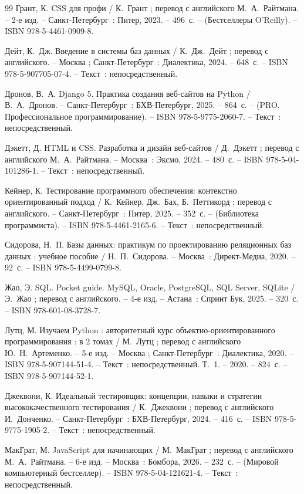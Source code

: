 \begin{thebibliography}{99}
     Грант, К. CSS для профи / К.~Грант ; перевод с английского М.~А.~Райтмана. -- 2-е изд. -- Санкт-Петербург~: Питер, 2023. -- 496~с. -- (Бестселлеры O'Reilly). -- ISBN 978-5-4461-0909-8. 

     Дейт, К.~Дж. Введение в системы баз данных / К.~Дж.~Дейт ; перевод с английского. -- Москва ; Санкт-Петербург~: Диалектика, 2024. -- 648~с. -- ISBN 978-5-907705-07-4. -- Текст~: непосредственный.

     Дронов, В.~А. Django 5. Практика создания веб-сайтов на Python / В.~А.~Дронов. -- Санкт-Петербург~: БХВ-Петербург, 2025. -- 864~с. -- (PRO. Профессиональное программирование). -- ISBN 978-5-9775-2060-7. -- Текст~: непосредственный.

     Дэкетт, Д. HTML и CSS. Разработка и дизайн веб-сайтов / Д.~Дэкетт ; перевод с английского М.~А.~Райтмана. -- Москва~: Эксмо, 2024. -- 480~с. -- ISBN 978-5-04-101286-1. -- Текст~: непосредственный.

     Кейнер, К. Тестирование программного обеспечения: контекстно ориентированный подход / К.~Кейнер, Дж.~Бах, Б.~Петтикорд ; перевод с английского. -- Санкт-Петербург~: Питер, 2025. -- 352~с. -- (Библиотека программиста). -- ISBN 978-5-4461-2165-6. -- Текст~: непосредственный.

     Сидорова, Н.~П. Базы данных: практикум по проектированию реляционных баз данных : учебное пособие / Н.~П.~Сидорова. -- Москва~: Директ-Медиа, 2020. -- 92~с. -- ISBN 978-5-4499-0799-8. 

     Жао, Э. SQL. Pocket guide. MySQL, Oracle, PostgreSQL, SQL Server, SQLite / Э.~Жао ; перевод с английского. -- 4-е изд. -- Астана~: Спринт Бук, 2025. -- 320~с. -- ISBN 978-601-08-3728-7. 

     Лутц, М. Изучаем Python : авторитетный курс объектно-ориентированного программирования : в 2 томах / М.~Лутц ; перевод с английского Ю.~Н.~Артеменко. -- 5-е изд. -- Москва ; Санкт-Петербург~: Диалектика, 2020. -- ISBN 978-5-907144-51-4. -- Текст~: непосредственный.
    Т.~1. -- 2020. -- 824~с. -- ISBN 978-5-907144-52-1.

     Джеквони, К. Идеальный тестировщик: концепции, навыки и стратегии высококачественного тестирования / К.~Джеквони ; перевод с английского И.~Донченко. -- Санкт-Петербург~: БХВ-Петербург, 2024. -- 416~с. -- ISBN 978-5-9775-1905-2. -- Текст~: непосредственный.

     МакГрат, М. JavaScript для начинающих / М.~МакГрат ; перевод с английского М.~А.~Райтмана. -- 6-е изд. -- Москва~: Бомбора, 2026. -- 232~с. -- (Мировой компьютерный бестселлер). -- ISBN 978-5-04-121621-4. -- Текст~: непосредственный.


\end{thebibliography}
